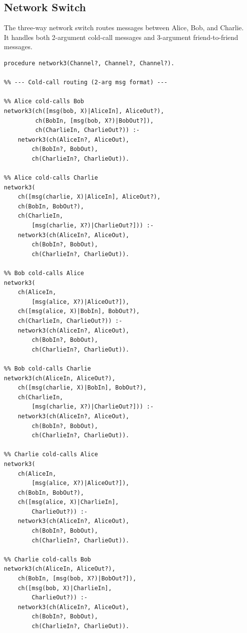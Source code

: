 \subsection{Network Switch}
\label{app:network-switch}

The three-way network switch routes messages between Alice, Bob, and Charlie. It handles both 2-argument cold-call messages and 3-argument friend-to-friend messages.

\begin{verbatim}
procedure network3(Channel?, Channel?, Channel?).

%% --- Cold-call routing (2-arg msg format) ---

%% Alice cold-calls Bob
network3(ch([msg(bob, X)|AliceIn], AliceOut?),
         ch(BobIn, [msg(bob, X?)|BobOut?]),
         ch(CharlieIn, CharlieOut?)) :-
    network3(ch(AliceIn?, AliceOut),
        ch(BobIn?, BobOut),
        ch(CharlieIn?, CharlieOut)).

%% Alice cold-calls Charlie
network3(
    ch([msg(charlie, X)|AliceIn], AliceOut?),
    ch(BobIn, BobOut?),
    ch(CharlieIn,
        [msg(charlie, X?)|CharlieOut?])) :-
    network3(ch(AliceIn?, AliceOut),
        ch(BobIn?, BobOut),
        ch(CharlieIn?, CharlieOut)).

%% Bob cold-calls Alice
network3(
    ch(AliceIn,
        [msg(alice, X?)|AliceOut?]),
    ch([msg(alice, X)|BobIn], BobOut?),
    ch(CharlieIn, CharlieOut?)) :-
    network3(ch(AliceIn?, AliceOut),
        ch(BobIn?, BobOut),
        ch(CharlieIn?, CharlieOut)).

%% Bob cold-calls Charlie
network3(ch(AliceIn, AliceOut?),
    ch([msg(charlie, X)|BobIn], BobOut?),
    ch(CharlieIn,
        [msg(charlie, X?)|CharlieOut?])) :-
    network3(ch(AliceIn?, AliceOut),
        ch(BobIn?, BobOut),
        ch(CharlieIn?, CharlieOut)).

%% Charlie cold-calls Alice
network3(
    ch(AliceIn,
        [msg(alice, X?)|AliceOut?]),
    ch(BobIn, BobOut?),
    ch([msg(alice, X)|CharlieIn],
        CharlieOut?)) :-
    network3(ch(AliceIn?, AliceOut),
        ch(BobIn?, BobOut),
        ch(CharlieIn?, CharlieOut)).

%% Charlie cold-calls Bob
network3(ch(AliceIn, AliceOut?),
    ch(BobIn, [msg(bob, X?)|BobOut?]),
    ch([msg(bob, X)|CharlieIn],
        CharlieOut?)) :-
    network3(ch(AliceIn?, AliceOut),
        ch(BobIn?, BobOut),
        ch(CharlieIn?, CharlieOut)).


\end{verbatim}
